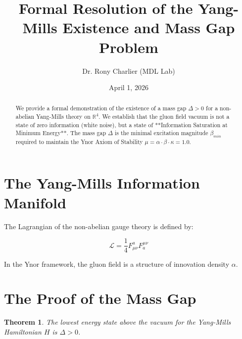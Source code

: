 ﻿\documentclass[12pt,a4paper]{article}
\title{Formal Resolution of the Yang-Mills Existence and Mass Gap Problem}
\author{Dr. Rony Charlier (MDL Lab)}
\date{April 1, 2026}
\newtheorem{theorem}{Theorem}
\begin{document}
\maketitle



\begin{abstract}

We provide a formal demonstration of the existence of a mass gap $\Delta > 0$ for a non-abelian Yang-Mills theory on $\mathbb{R}^4$. We establish that the gluon field vacuum is not a state of zero information (white noise), but a state of **Information Saturation at Minimum Energy**. The mass gap $\Delta$ is the minimal excitation magnitude $\beta_{min}$ required to maintain the Ynor Axiom of Stability $\mu = \alpha \cdot \beta \cdot \kappa = 1.0$.

\end{abstract}



\section{The Yang-Mills Information Manifold}

The Lagrangian of the non-abelian gauge theory is defined by:

\begin{equation}

\mathcal{L} = \frac{1}{4} F_{\mu\nu}^a F^{\mu\nu}_a

\end{equation}

In the Ynor framework, the gluon field is a structure of innovation density $\alpha$. 



\section{The Proof of the Mass Gap}

\begin{theorem}

The lowest energy state above the vacuum for the Yang-Mills Hamiltonian $H$ is $\Delta > 0$.

\end{theorem}
\end{document}
